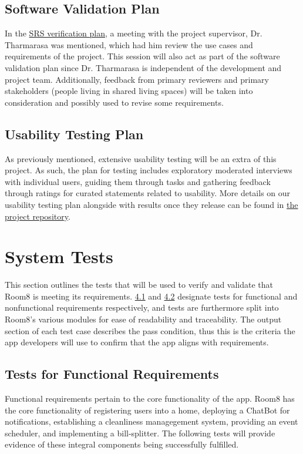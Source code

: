 \documentclass[12pt, titlepage]{article}
\begin{document}
\subsection{Software Validation Plan}
In the \hyperref[section:SRSVerificationPlan]{SRS verification plan}, a meeting with the project supervisor, Dr. Tharmarasa was mentioned, which had him review the use cases and requirements of the project. This session will also act as part of the software validation plan since Dr. Tharmarasa is independent of the development and project team. Additionally, feedback from primary reviewers and primary stakeholders (people living in shared living spaces) will be taken into consideration and possibly used to revise some requirements.  
\subsection{Usability Testing Plan}
As previously mentioned, extensive usability testing will be an extra of this project. As such, the plan for testing includes exploratory moderated interviews with individual users, guiding them through tasks and gathering feedback through ratings for curated statements related to usability. More details on our usability testing plan alongside with results once they release can be found in \href{https://github.com/jinalkast/room8/tree/main/usability}{the project repository}.

\section{System Tests}
\label{section:systemTests}
This section outlines the tests that will be used to verify and validate that Room8 is meeting its requirements. \hyperref[subsec:testsForFunc]{4.1} and \hyperref[subsec:testsForNonFunc]{4.2} designate tests for functional and nonfunctional requirements respectively, and tests are furthermore split into Room8's various modules for ease of readability and traceability. The output section of each test case describes the pass condition, thus this is the criteria the app developers will use to confirm that the app aligns with requirements. 

\subsection{Tests for Functional Requirements}
\label{subsec:testsForFunc}
Functional requirements pertain to the core functionality of the app. Room8 has the core functionality of registering users into a home, deploying a ChatBot for notifications, establishing a cleanliness managegement system, providing an event scheduler, and implementing a bill-splitter. The following tests will provide evidence of these integral components being successfully fulfilled.
\end{document}
